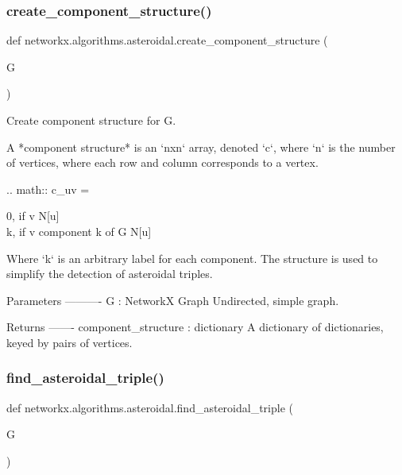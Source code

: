 \subsubsection{\texorpdfstring{create\+\_\+component\+\_\+structure()}{create\_component\_structure()}}
{\footnotesize\ttfamily def networkx.\+algorithms.\+asteroidal.\+create\+\_\+component\+\_\+structure (\begin{DoxyParamCaption}\item[{}]{G }\end{DoxyParamCaption})}

\begin{DoxyVerb}Create component structure for G.

A *component structure* is an `nxn` array, denoted `c`, where `n` is
the number of vertices,  where each row and column corresponds to a vertex.

.. math::
    c_{uv} = \begin{cases} 0, if v \in N[u] \\
        k, if v \in component k of G \setminus N[u] \end{cases}

Where `k` is an arbitrary label for each component. The structure is used
to simplify the detection of asteroidal triples.

Parameters
----------
G : NetworkX Graph
    Undirected, simple graph.

Returns
-------
component_structure : dictionary
    A dictionary of dictionaries, keyed by pairs of vertices.\end{DoxyVerb}
 \mbox{\label{namespacenetworkx_1_1algorithms_1_1asteroidal_a52ad59ee149f23832e47b4134b0a38c5}} 
\subsubsection{\texorpdfstring{find\+\_\+asteroidal\+\_\+triple()}{find\_asteroidal\_triple()}}
{\footnotesize\ttfamily def networkx.\+algorithms.\+asteroidal.\+find\+\_\+asteroidal\+\_\+triple (\begin{DoxyParamCaption}\item[{}]{G }\end{DoxyParamCaption})}

